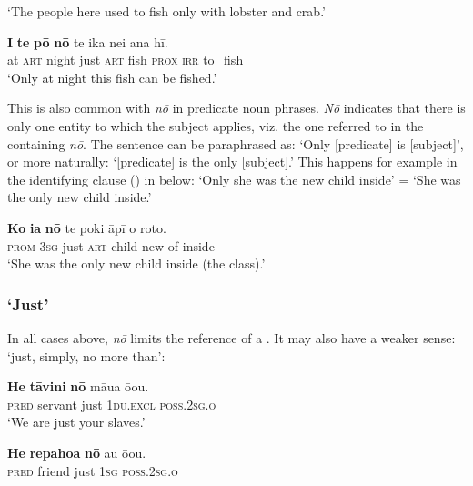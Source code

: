 \glt 
‘The people here used to fish only with lobster and crab.’ \textstyleExampleref{[R354.029]} 
\z

\ea\label{ex:5.147}
\gll \textbf{{\ꞌ}I} \textbf{te} \textbf{pō} \textbf{nō} te ika nei ana hī. \\
at \textsc{art} night just \textsc{art} fish \textsc{prox} \textsc{irr} to\_fish \\

\glt
‘Only at night this fish can be fished.’ \textstyleExampleref{[R364.007]} 
\z

This is also common with \textit{nō} in predicate noun phrases. \textit{Nō} indicates that there is only one entity to which the subject applies, viz. the one referred to in the  containing \textit{nō}. The sentence can be paraphrased as: ‘Only [predicate] is [subject]’, or more naturally: ‘[predicate] is the only [subject].’ This happens for example in the identifying clause () in  below: ‘Only she was the new child inside’ = ‘She was the only new child inside.’ 

\ea\label{ex:5.148}
\gll \textbf{Ko} \textbf{ia} \textbf{nō} te poki {\ꞌ}āpī o roto. \\
\textsc{prom} \textsc{3sg} just \textsc{art} child new of inside \\

\glt 
‘She was the only new child inside (the class).’ \textstyleExampleref{[R151.020]} 
\z

\subsubsection{‘Just’}\label{sec:5.8.2.3}

In all cases above, \textit{nō} limits the reference of a . It may also have a weaker sense: ‘just, simply, no more than’:

\ea\label{ex:5.149}
\gll \textbf{He} \textbf{tāvini} \textbf{nō} māua ō{\ꞌ}ou. \\
\textsc{pred} servant just \textsc{1du.excl} \textsc{poss.2sg.o} \\

\glt 
‘We are just your slaves.’ \textstyleExampleref{[R214.015]} 
\z

\ea\label{ex:5.150}
\gll \textbf{He} \textbf{repahoa} \textbf{nō} au ō{\ꞌ}ou. \\
\textsc{pred} friend just \textsc{1sg} \textsc{poss.2sg.o} \\

